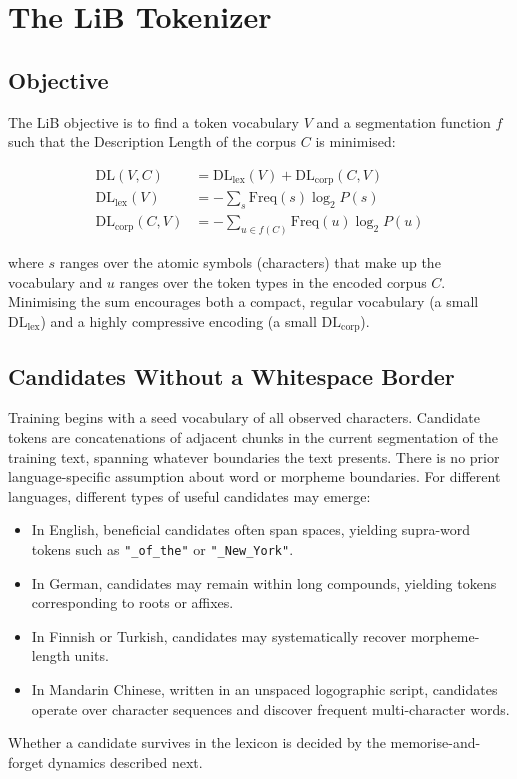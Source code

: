 \documentclass[pdflatex,sn-apa]{sn-jnl}
\begin{document}
\section{The LiB Tokenizer}
\label{sec:lib}

\subsection{Objective}

The LiB objective \citep{yang2020less} is to find a token vocabulary $V$ and a
segmentation function $f$ such that the Description Length of the corpus $C$ is
minimised:

\begin{align}
  \mathrm{DL}(V, C) &= \mathrm{DL}_\mathrm{lex}(V) + \mathrm{DL}_\mathrm{corp}(C, V) \\
  \mathrm{DL}_\mathrm{lex}(V) &= -\sum_{s} \mathrm{Freq}(s) \log_2 P(s) \\
  \mathrm{DL}_\mathrm{corp}(C, V) &= -\sum_{u \in f(C)} \mathrm{Freq}(u) \log_2 P(u)
\end{align}

where $s$ ranges over the atomic symbols (characters) that make up the
vocabulary and $u$ ranges over the token types in the encoded corpus $C$.
Minimising the sum encourages both a compact, regular vocabulary
(a small $\mathrm{DL}_\mathrm{lex}$) and a highly compressive encoding
(a small $\mathrm{DL}_\mathrm{corp}$).

\subsection{Candidates Without a Whitespace Border}

Training begins with a seed vocabulary of all observed characters.
Candidate tokens are concatenations of adjacent chunks in the current
segmentation of the training text, spanning whatever
boundaries the text presents. There is no prior language-specific assumption about word or
morpheme boundaries. For different languages, different types of useful candidates may emerge:

\begin{itemize}
  \item In English, beneficial candidates often span spaces, yielding
        supra-word tokens such as \texttt{"\_of\_the"} or
        \texttt{"\_New\_York"}.
  \item In German, candidates may remain within long compounds, yielding
        tokens corresponding to roots or affixes.
  \item In Finnish or Turkish, candidates may systematically recover
        morpheme-length units.
  \item In Mandarin Chinese, written in an unspaced logographic script,
        candidates operate over character sequences and discover frequent
        multi-character words.
\end{itemize}
Whether a candidate survives in the lexicon is decided by the
memorise-and-forget dynamics described next.
\end{document}
